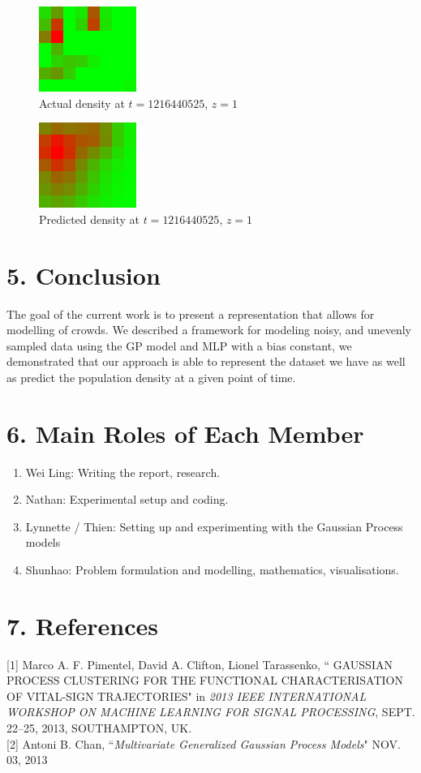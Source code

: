 \documentclass[letterpaper]{article}
\begin{document}
\begin{figure}[h!]
  \centering
    \includegraphics[width=120px,natwidth=320,natheight=280]{selected_renders/1_1216440525.png}
  \caption{Actual density at $t=1216440525$, $z=1$}
  \label{fig:t3dist}
\end{figure}

\begin{figure}[h!]
  \centering
    \includegraphics[width=120px,natwidth=320,natheight=280]{selected_renders/1_1216440525p.png}
  \caption{Predicted density at $t=1216440525$, $z=1$}
  \label{fig:t4dist}
\end{figure}


\section{5.  Conclusion}

The goal of the current work is to present a representation that allows for modelling of crowds. We described a framework for modeling noisy, and unevenly sampled
data using the GP model and MLP with a bias constant, we demonstrated that our approach is able to represent the dataset we have as well as predict the population density at a given point of time.

\section{6. Main Roles of Each Member}
\begin{enumerate}
\item Wei Ling: Writing the report, research.
\item Nathan: Experimental setup and coding.
\item Lynnette / Thien: Setting up and experimenting with the Gaussian Process models
\item Shunhao: Problem formulation and modelling, mathematics, visualisations.
\end{enumerate}

\section{7.  References}

[1] Marco A. F. Pimentel, David A. Clifton, Lionel Tarassenko, `` GAUSSIAN PROCESS CLUSTERING FOR THE FUNCTIONAL CHARACTERISATION OF VITAL-SIGN TRAJECTORIES"
 in {\it 2013 IEEE INTERNATIONAL WORKSHOP ON MACHINE LEARNING FOR SIGNAL PROCESSING}, SEPT. 22–25, 2013, SOUTHAMPTON, UK. \\

[2] Antoni B. Chan, ``{\it Multivariate Generalized Gaussian Process Models}" NOV. 03, 2013
\end{document}
